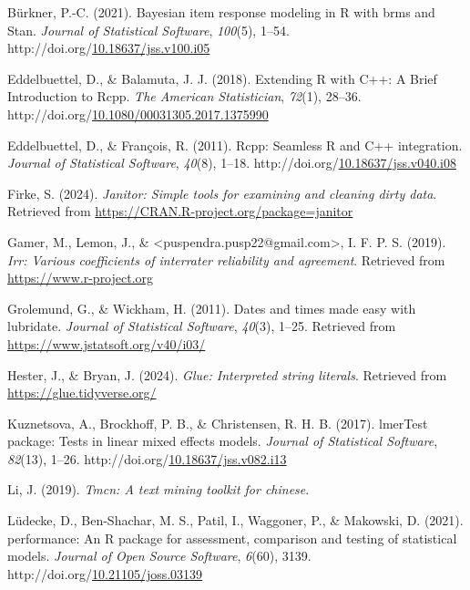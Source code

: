 \documentclass[
  english,
  man,floatsintext]{apa6}
\newlength{\cslhangindent}
\newenvironment{CSLReferences}[2] %
 {\begin{list}{}{%
  \setlength{\itemindent}{0pt}
  \setlength{\leftmargin}{0pt}
  \setlength{\parsep}{0pt}
  \ifodd #1
   \setlength{\leftmargin}{\cslhangindent}
   \setlength{\itemindent}{-1\cslhangindent}
  \fi
  \setlength{\itemsep}{#2\baselineskip}}}
 {\end{list}}
\begin{document}
\begin{CSLReferences}{1}{0}
Bürkner, P.-C. (2021). Bayesian item response modeling in {R} with {brms} and {Stan}. \emph{Journal of Statistical Software}, \emph{100}(5), 1--54. http://doi.org/\href{https://doi.org/10.18637/jss.v100.i05}{10.18637/jss.v100.i05}

Eddelbuettel, D., \& Balamuta, J. J. (2018). {Extending {R} with {C++}: A Brief Introduction to {Rcpp}}. \emph{The American Statistician}, \emph{72}(1), 28--36. http://doi.org/\href{https://doi.org/10.1080/00031305.2017.1375990}{10.1080/00031305.2017.1375990}

Eddelbuettel, D., \& François, R. (2011). {Rcpp}: Seamless {R} and {C++} integration. \emph{Journal of Statistical Software}, \emph{40}(8), 1--18. http://doi.org/\href{https://doi.org/10.18637/jss.v040.i08}{10.18637/jss.v040.i08}

Firke, S. (2024). \emph{Janitor: Simple tools for examining and cleaning dirty data}. Retrieved from \url{https://CRAN.R-project.org/package=janitor}

Gamer, M., Lemon, J., \& \textless puspendra.pusp22@gmail.com\textgreater, I. F. P. S. (2019). \emph{Irr: Various coefficients of interrater reliability and agreement}. Retrieved from \url{https://www.r-project.org}

Grolemund, G., \& Wickham, H. (2011). Dates and times made easy with {lubridate}. \emph{Journal of Statistical Software}, \emph{40}(3), 1--25. Retrieved from \url{https://www.jstatsoft.org/v40/i03/}

Hester, J., \& Bryan, J. (2024). \emph{Glue: Interpreted string literals}. Retrieved from \url{https://glue.tidyverse.org/}

Kuznetsova, A., Brockhoff, P. B., \& Christensen, R. H. B. (2017). {lmerTest} package: Tests in linear mixed effects models. \emph{Journal of Statistical Software}, \emph{82}(13), 1--26. http://doi.org/\href{https://doi.org/10.18637/jss.v082.i13}{10.18637/jss.v082.i13}

Li, J. (2019). \emph{Tmcn: A text mining toolkit for chinese}.

Lüdecke, D., Ben-Shachar, M. S., Patil, I., Waggoner, P., \& Makowski, D. (2021). {performance}: An {R} package for assessment, comparison and testing of statistical models. \emph{Journal of Open Source Software}, \emph{6}(60), 3139. http://doi.org/\href{https://doi.org/10.21105/joss.03139}{10.21105/joss.03139}


\end{CSLReferences}
\end{document}
